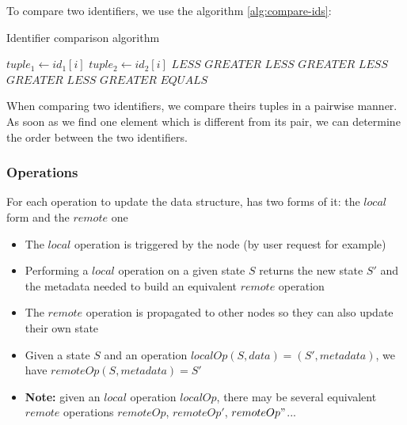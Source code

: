 \documentclass[a4paper]{article}
\begin{document}
To compare two identifiers, we use the algorithm \ref{alg:compare-ids}:

\begin{algorithm}
  \caption{Identifier comparison algorithm}\label{alg:compare-ids}
  \begin{algorithmic}
        \State $tuple_1 \gets id_1[i]$
        \State $tuple_2 \gets id_2[i]$
          \State \Return $LESS$
          \State \Return $GREATER$
          \State \Return $LESS$
          \State \Return $GREATER$
          \State \Return $LESS$
          \State \Return $GREATER$
        \EndIf
      \EndFor
        \State \Return $LESS$
        \State \Return $GREATER$
      \EndIf
      \State \Return $EQUALS$
    \EndFunction
  \end{algorithmic}
\end{algorithm}

When comparing two identifiers, we compare theirs tuples in a pairwise manner.
As soon as we find one element which is different from its pair,
we can determine the order between the two identifiers.

\subsubsection{Operations}

For each operation to update the data structure, has two forms of it: the $local$ form and the $remote$ one
\begin{itemize}
  \item The $local$ operation is triggered by the node (by user request for example)
  \item Performing a $local$ operation on a given state $S$
    returns the new state $S'$ and the metadata needed to build an equivalent $remote$ operation
  \item The $remote$ operation is propagated to other nodes so they can also update their own state
  \item Given a state $S$ and an operation $localOp(S, data) = (S', metadata)$, we have $remoteOp(S, metadata) = S'$
  \item \textbf{Note: } given an $local$ operation $localOp$, there may be several equivalent $remote$ operations $remoteOp$, $remoteOp'$, $remoteOp"$...
\end{itemize}
\end{document}
